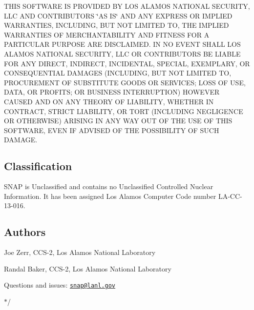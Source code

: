 T\-H\-I\-S S\-O\-F\-T\-W\-A\-R\-E I\-S P\-R\-O\-V\-I\-D\-E\-D B\-Y L\-O\-S A\-L\-A\-M\-O\-S N\-A\-T\-I\-O\-N\-A\-L S\-E\-C\-U\-R\-I\-T\-Y, L\-L\-C A\-N\-D C\-O\-N\-T\-R\-I\-B\-U\-T\-O\-R\-S \char`\"{}\-A\-S I\-S\char`\"{} A\-N\-D A\-N\-Y E\-X\-P\-R\-E\-S\-S O\-R I\-M\-P\-L\-I\-E\-D W\-A\-R\-R\-A\-N\-T\-I\-E\-S, I\-N\-C\-L\-U\-D\-I\-N\-G, B\-U\-T N\-O\-T L\-I\-M\-I\-T\-E\-D T\-O, T\-H\-E I\-M\-P\-L\-I\-E\-D W\-A\-R\-R\-A\-N\-T\-I\-E\-S O\-F M\-E\-R\-C\-H\-A\-N\-T\-A\-B\-I\-L\-I\-T\-Y A\-N\-D F\-I\-T\-N\-E\-S\-S F\-O\-R A P\-A\-R\-T\-I\-C\-U\-L\-A\-R P\-U\-R\-P\-O\-S\-E A\-R\-E D\-I\-S\-C\-L\-A\-I\-M\-E\-D. I\-N N\-O E\-V\-E\-N\-T S\-H\-A\-L\-L L\-O\-S A\-L\-A\-M\-O\-S N\-A\-T\-I\-O\-N\-A\-L S\-E\-C\-U\-R\-I\-T\-Y, L\-L\-C O\-R C\-O\-N\-T\-R\-I\-B\-U\-T\-O\-R\-S B\-E L\-I\-A\-B\-L\-E F\-O\-R A\-N\-Y D\-I\-R\-E\-C\-T, I\-N\-D\-I\-R\-E\-C\-T, I\-N\-C\-I\-D\-E\-N\-T\-A\-L, S\-P\-E\-C\-I\-A\-L, E\-X\-E\-M\-P\-L\-A\-R\-Y, O\-R C\-O\-N\-S\-E\-Q\-U\-E\-N\-T\-I\-A\-L D\-A\-M\-A\-G\-E\-S (I\-N\-C\-L\-U\-D\-I\-N\-G, B\-U\-T N\-O\-T L\-I\-M\-I\-T\-E\-D T\-O, P\-R\-O\-C\-U\-R\-E\-M\-E\-N\-T O\-F S\-U\-B\-S\-T\-I\-T\-U\-T\-E G\-O\-O\-D\-S O\-R S\-E\-R\-V\-I\-C\-E\-S; L\-O\-S\-S O\-F U\-S\-E, D\-A\-T\-A, O\-R P\-R\-O\-F\-I\-T\-S; O\-R B\-U\-S\-I\-N\-E\-S\-S I\-N\-T\-E\-R\-R\-U\-P\-T\-I\-O\-N) H\-O\-W\-E\-V\-E\-R C\-A\-U\-S\-E\-D A\-N\-D O\-N A\-N\-Y T\-H\-E\-O\-R\-Y O\-F L\-I\-A\-B\-I\-L\-I\-T\-Y, W\-H\-E\-T\-H\-E\-R I\-N C\-O\-N\-T\-R\-A\-C\-T, S\-T\-R\-I\-C\-T L\-I\-A\-B\-I\-L\-I\-T\-Y, O\-R T\-O\-R\-T (I\-N\-C\-L\-U\-D\-I\-N\-G N\-E\-G\-L\-I\-G\-E\-N\-C\-E O\-R O\-T\-H\-E\-R\-W\-I\-S\-E) A\-R\-I\-S\-I\-N\-G I\-N A\-N\-Y W\-A\-Y O\-U\-T O\-F T\-H\-E U\-S\-E O\-F T\-H\-I\-S S\-O\-F\-T\-W\-A\-R\-E, E\-V\-E\-N I\-F A\-D\-V\-I\-S\-E\-D O\-F T\-H\-E P\-O\-S\-S\-I\-B\-I\-L\-I\-T\-Y O\-F S\-U\-C\-H D\-A\-M\-A\-G\-E.

\subsection*{Classification}

S\-N\-A\-P is Unclassified and contains no Unclassified Controlled Nuclear Information. It has been assigned Los Alamos Computer Code number L\-A-\/\-C\-C-\/13-\/016.

\subsection*{Authors}


\begin{DoxyItemize}
\item Joe Zerr, C\-C\-S-\/2, Los Alamos National Laboratory
\item Randal Baker, C\-C\-S-\/2, Los Alamos National Laboratory
\end{DoxyItemize}

Questions and issues\-: \href{mailto:snap@lanl.gov}{\tt snap@lanl.\-gov}

$\ast$/ 